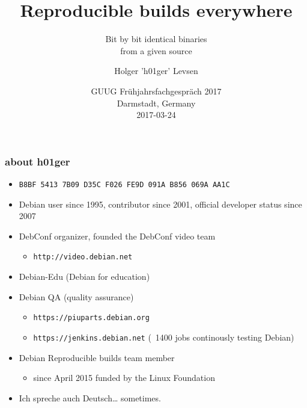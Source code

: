 \documentclass[14pt]{beamer}
\title[Reproducible Builds everywhere]{Reproducible
builds everywhere}
\subtitle{Bit by bit identical binaries \\
from a given source}
\author[h01ger]{%
   \texorpdfstring{
            \centering
            Holger 'h01ger' Levsen
   }{h01ger}}
\date[GUUG 2017]{%
 GUUG Frühjahrsfachgespräch 2017\\
Darmstadt, Germany\\
 \small{2017-03-24}}
\newif\ifplacelogo
\begin{document}
\placelogofalse

\begin{frame}[plain]
 \titlepage
\end{frame}

\placelogotrue

\begin{frame}
 \frametitle{about h01ger}

 \begin{itemize}
  \item \small{\texttt{B8BF 5413 7B09 D35C F026  FE9D 091A B856 069A AA1C}}
  \item Debian user since 1995, contributor since 2001, official developer
  status since 2007
  \item DebConf organizer,
  founded the DebConf video team
   \begin{itemize}
    \item \texttt{http://video.debian.net}
   \end{itemize}
 \item Debian-Edu (Debian for education)
  \item Debian QA (quality assurance)
  \begin{itemize}
   \item \texttt{https://piuparts.debian.org}
   \item \texttt{https://jenkins.debian.net} (~1400 jobs continously testing Debian)
  \end{itemize}
  \item Debian Reproducible builds team member
  \begin{itemize}
   \item since April 2015 funded by the Linux Foundation
 \end{itemize}
  \item<2> Ich spreche auch Deutsch… sometimes.
 \end{itemize}
\end{frame}
\end{document}
